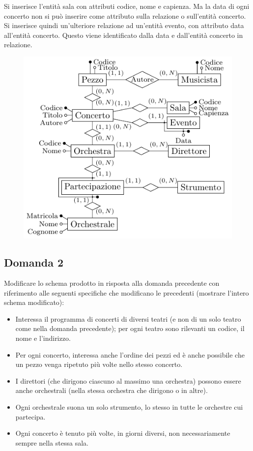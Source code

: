 \documentclass{article}
\numberwithin{equation}{subsection}
\begin{document}
Si inserisce l'entità sala con attributi codice, nome e capienza. Ma la data di ogni concerto non si può inserire come attributo sulla relazione o 
sull'entità concerto. Si inserisce quindi un'ulteriore relazione ad un'entità evento, con attributo data all'entità concerto. Questo viene identificato 
dalla data e dall'entità concerto in relazione. 

\begin{figure}[H]%
    \centering
    \includegraphics[scale=1.25]{schema_er_es_3.pdf}%
\end{figure}

\subsection{Domanda 2}

Modificare lo schema prodotto in risposta alla domanda precedente con riferimento alle seguenti specifiche che modificano le precedenti 
(mostrare l'intero schema modificato):
\begin{itemize}
    \item Interessa il programma di concerti di diversi teatri (e non di un solo teatro come nella domanda precedente); per ogni teatro sono rilevanti un codice, il nome e l'indirizzo. 
    \item Per ogni concerto, interessa anche l'ordine dei pezzi ed è anche possibile che un pezzo venga ripetuto più volte nello stesso concerto. 
    \item I direttori (che dirigono ciascuno al massimo una orchestra) possono essere anche orchestrali (nella stessa orchestra che dirigono o in altre). 
    \item Ogni orchestrale suona un solo strumento, lo stesso in tutte le orchestre cui partecipa.
    \item Ogni concerto è tenuto più volte, in giorni diversi, non necessariamente sempre nella stessa sala. 
\end{itemize}
\end{document}
